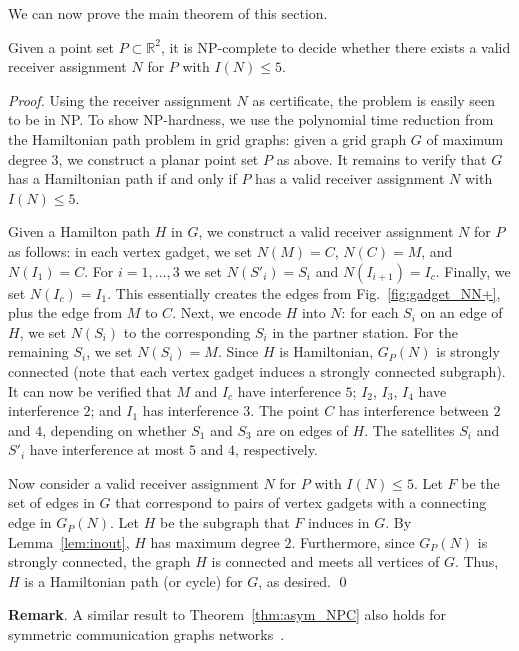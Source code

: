 \documentclass[envcountsect,envcountsame,runningheads,a4paper]{llncs}
\newcommand\R{{\mathbb R}}
\begin{document}
\noindent
We can now prove the main theorem of this section.

\begin{theorem}\label{thm:asym_NPC}
Given a point set $P \subset \R^2$, it is
\textup{NP}-complete to decide whether
there exists a valid receiver assignment $N$ for
$P$ with $I(N) \leq 5$.
\end{theorem}

\begin{proof}
Using the receiver assignment $N$ as certificate,
the problem is easily seen to be in NP.
To show NP-hardness, we use the polynomial time reduction
from the Hamiltonian path problem in grid graphs:
given a grid graph $G$ of maximum degree
$3$, we construct a planar point set $P$ as above.
It remains to verify that $G$ has a Hamiltonian path
if and only if $P$ has a valid receiver assignment $N$
with $I(N) \leq 5$.

Given a Hamilton path $H$ in
$G$, we construct
a valid receiver assignment $N$ for
$P$ as follows:
in each vertex gadget, we set $N(M) = C$,
$N(C) = M$, and $N(I_1) =C $. For
$i = 1, \dots, 3$ we set $N(S'_i) = S_i$ and
$N(I_{i+1}) = I_c$.
Finally, we set $N(I_c) = I_1$.
This essentially creates the edges from
Fig.~\ref{fig:gadget_NN+}, plus the edge
from $M$ to $C$.
Next, we encode $H$ into $N$: for each $S_i$ on
an edge of $H$, we set $N(S_i)$  to the corresponding
$S_i$ in the partner station. For the remaining
$S_i$, we set $N(S_i) = M$.
Since $H$ is Hamiltonian,
$G_P(N)$ is
strongly connected (note that
each vertex gadget induces a strongly connected
subgraph).
It can now be verified that $M$ and $I_c$ have
interference $5$;
$I_2$, $I_3$, $I_4$ have interference $2$; and
$I_1$ has interference $3$.
The point $C$ has interference between $2$ and
$4$, depending on whether $S_1$ and $S_3$ are
on edges of $H$.
The satellites $S_i$ and $S'_i$
have interference at most $5$ and $4$,
respectively.

Now consider a valid receiver assignment $N$ for
$P$ with
$I(N) \leq 5$.
Let $F$ be the set of edges in $G$ that correspond
to  pairs of vertex gadgets with a connecting edge
in $G_P(N)$.
Let $H$ be the subgraph that $F$ induces in $G$.
By Lemma~\ref{lem:inout}, $H$ has maximum degree $2$.
Furthermore, since $G_P(N)$ is strongly connected,
the graph $H$ is connected and meets all vertices of $G$.
Thus, $H$ is a Hamiltonian path (or cycle) for $G$,
as desired.
\qed{}
\end{proof}

\textbf{Remark}.  A similar result to Theorem~\ref{thm:asym_NPC}
also holds for symmetric communication graphs networks~\cite{Buchin08}.
\end{document}
